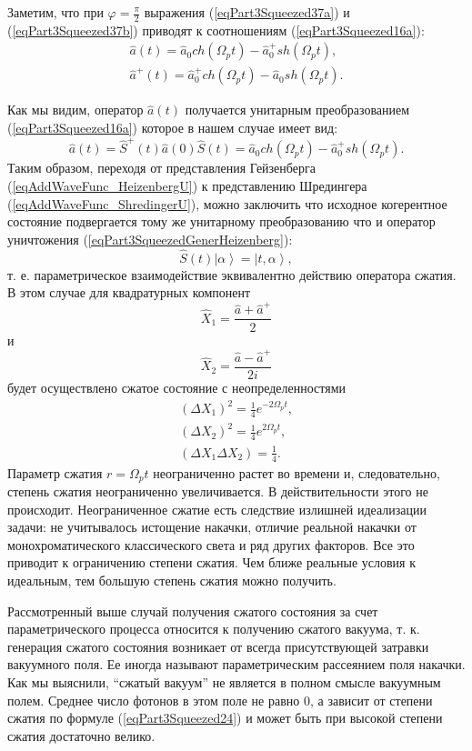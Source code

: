 Заметим, что при $\varphi = \frac{\pi}{2}$ выражения
(\ref{eqPart3Squeezed37a}) и (\ref{eqPart3Squeezed37b}) приводят к
соотношениям
(\ref{eqPart3Squeezed16a}):
\begin{eqnarray}
\hat{a}\left(t\right) = \hat{a}_0 ch \left(\Omega_p t \right) - 
\hat{a}^{+}_0 sh \left(\Omega_p t\right),
\nonumber \\
\hat{a}^{+}\left(t\right) = \hat{a}^{+}_0 ch \left(\Omega_p t \right) -
\hat{a}_0 sh \left(\Omega_p t\right).
\nonumber
\end{eqnarray}

Как мы видим, оператор $\hat{a}\left(t\right)$ получается унитарным
преобразованием (\ref{eqPart3Squeezed16a}) которое в нашем случае
имеет вид:
\begin{equation}
\hat{a}\left(t\right) =
\hat{S}^{+}\left(t\right)
\hat{a}\left(0\right)
\hat{S}\left(t\right) =
\hat{a}_0 ch \left(\Omega_p t \right) - 
\hat{a}^{+}_0 sh \left(\Omega_p t\right).
\label{eqPart3SqueezedGenerHeizenberg}
\end{equation}
Таким образом, переходя от представления Гейзенберга
(\ref{eqAddWaveFunc_HeizenbergU})
к представлению Шредингера (\ref{eqAddWaveFunc_ShredingerU}), можно
заключить что исходное когерентное состояние подвергается тому же
унитарному преобразованию что и оператор уничтожения
(\ref{eqPart3SqueezedGenerHeizenberg}):
\begin{equation}
\hat{S}\left(t\right)
\left|\alpha\right> =
\left|t, \alpha\right>,
\nonumber
\end{equation}
т. е. параметрическое взаимодействие эквивалентно действию оператора
сжатия. В этом случае для
квадратурных компонент 
\[
\hat{X}_1 = \frac{\hat{a} + \hat{a}^{+}}{2}
\]
и
\[
\hat{X}_2 = \frac{\hat{a} - \hat{a}^{+}}{2i}
\]
будет осуществлено сжатое состояние с неопределенностями 
\begin{eqnarray}
\left(\Delta X_1\right)^2 = 
\frac{1}{4}e^{-2 \Omega_p t},
\nonumber \\
\left(\Delta X_2\right)^2 = 
\frac{1}{4}e^{2 \Omega_p t},
\nonumber \\
\left(\Delta X_1 \Delta X_2\right) = 
\frac{1}{4}.
\nonumber
\end{eqnarray}
Параметр сжатия $r = \Omega_p t$ неограниченно растет во времени и,
следовательно, степень сжатия неограниченно увеличивается. В
действительности этого не происходит. Неограниченное сжатие есть
следствие излишней идеализации задачи: не учитывалось истощение
накачки, отличие реальной накачки от монохроматического классического
света и ряд других факторов. Все это приводит к ограничению степени
сжатия. Чем ближе реальные условия к идеальным, тем большую степень
сжатия можно получить. 

Рассмотренный выше случай получения сжатого состояния за счет
параметрического процесса относится к получению сжатого вакуума,
т. к. генерация сжатого состояния возникает от всегда присутствующей
затравки вакуумного поля. Ее иногда называют параметрическим
рассеянием поля накачки. Как мы выяснили, ``сжатый вакуум'' не является
в полном смысле вакуумным полем. Среднее число фотонов в этом поле не
равно 0, а зависит от степени сжатия по формуле
(\ref{eqPart3Squeezed24}) и может быть при 
высокой степени сжатия достаточно велико.

